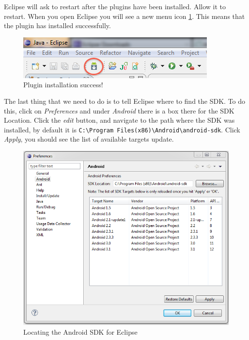 Eclipse will ask to restart after the plugins have been installed. Allow it to restart. When you open Eclipse you will see a new menu icon \ref{fig:adt_success}. This means that the plugin has installed successfully.

\begin{figure}[!ht]
  \includegraphics[width=\textwidth]{./images/success.png}%
  \caption{Plugin installation success!}
  \label{fig:adt_success}
\end{figure}

The last thing that we need to do is to tell Eclipse where to find the SDK. To do this, click on \textit{Preferences} and under \textit{Android} there is a box there for the SDK Location. Click the \textit{edit} button, and navigate to the path where the SDK was installed, by default it is \newline
\Verb|C:\Program Files(x86)\Android\android-sdk|. Click \textit{Apply}, you should see the list of available targets update.

\begin{figure}[!ht]
  \includegraphics[width=\textwidth]{./images/sdk_location.png}%
  \caption{Locating the Android SDK for Eclipse}
  \label{fig:find_android_sdk}
\end{figure}

